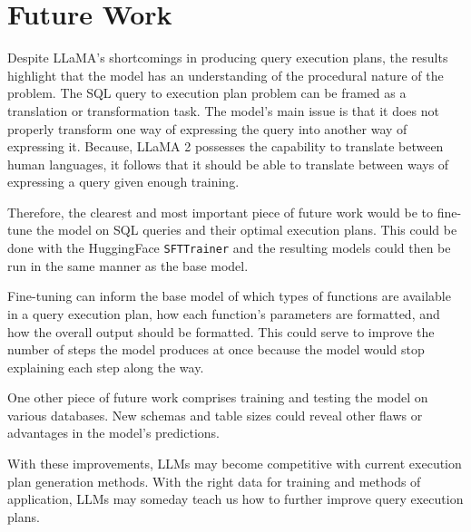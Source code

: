 \section{Future Work}
Despite LLaMA's shortcomings in producing query execution plans, the results highlight that the model has an understanding of the procedural nature of the problem. The SQL query to execution plan problem can be framed as a translation or transformation task. The model's main issue is that it does not properly transform one way of expressing the query into another way of expressing it. Because, LLaMA 2 possesses the capability to translate between human languages, it follows that it should be able to translate between ways of expressing a query given enough training.

Therefore, the clearest and most important piece of future work would be to fine-tune the model on SQL queries and their optimal execution plans. This could be done with the HuggingFace \lstinline{SFTTrainer} and the resulting models could then be run in the same manner as the base model.

Fine-tuning can inform the base model of which types of functions are available in a query execution plan, how each function's parameters are formatted, and how the overall output should be formatted. This could serve to improve the number of steps the model produces at once because the model would stop explaining each step along the way.

One other piece of future work comprises training and testing the model on various databases. New schemas and table sizes could reveal other flaws or advantages in the model's predictions.

With these improvements, LLMs may become competitive with current execution plan generation methods. With the right data for training and methods of application, LLMs may someday teach us how to further improve query execution plans.
